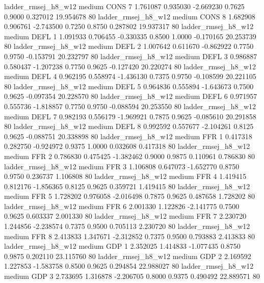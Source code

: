    ladder_rmsej_h8_w12     medium     CONS                 7  1.761087 0.935030 -2.669230 0.7625 0.9000  0.327012   19.954678 80
   ladder_rmsej_h8_w12     medium     CONS                 8  1.682908 0.906761 -2.743500 0.7250 0.8750  0.287802   19.937317 80
   ladder_rmsej_h8_w12     medium     DEFL                 1  1.091933 0.706455 -0.330335 0.8500 1.0000 -0.170165   20.253739 80
   ladder_rmsej_h8_w12     medium     DEFL                 2  1.007642 0.611670 -0.862922 0.7750 0.9750 -0.153791   20.232797 80
   ladder_rmsej_h8_w12     medium     DEFL                 3  0.986887 0.580437 -1.207238 0.7750 0.9625 -0.127420   20.220274 80
   ladder_rmsej_h8_w12     medium     DEFL                 4  0.962195 0.558974 -1.436130 0.7375 0.9750 -0.108599   20.221105 80
   ladder_rmsej_h8_w12     medium     DEFL                 5  0.964836 0.555894 -1.643673 0.7500 0.9625 -0.097354   20.228570 80
   ladder_rmsej_h8_w12     medium     DEFL                 6  0.971957 0.555736 -1.818857 0.7750 0.9750 -0.088594   20.253550 80
   ladder_rmsej_h8_w12     medium     DEFL                 7  0.982193 0.556179 -1.969921 0.7875 0.9625 -0.085610   20.291858 80
   ladder_rmsej_h8_w12     medium     DEFL                 8  0.992592 0.557677 -2.104261 0.8125 0.9625 -0.088751   20.338898 80
   ladder_rmsej_h8_w12     medium      FFR                 1  0.417318 0.282750 -0.924972 0.9375 1.0000  0.032608    0.417318 80
   ladder_rmsej_h8_w12     medium      FFR                 2  0.786830 0.475425 -1.382462 0.9000 0.9875  0.110961    0.786830 80
   ladder_rmsej_h8_w12     medium      FFR                 3  1.106808 0.647073 -1.652770 0.8750 0.9750  0.236737    1.106808 80
   ladder_rmsej_h8_w12     medium      FFR                 4  1.419415 0.812176 -1.856365 0.8125 0.9625  0.359721    1.419415 80
   ladder_rmsej_h8_w12     medium      FFR                 5  1.728202 0.976058 -2.016498 0.7875 0.9625  0.487658    1.728202 80
   ladder_rmsej_h8_w12     medium      FFR                 6  2.001330 1.122826 -2.141775 0.7500 0.9625  0.603337    2.001330 80
   ladder_rmsej_h8_w12     medium      FFR                 7  2.230720 1.244856 -2.238574 0.7375 0.9500  0.705113    2.230720 80
   ladder_rmsej_h8_w12     medium      FFR                 8  2.413833 1.347671 -2.312852 0.7375 0.9500  0.793883    2.413833 80
   ladder_rmsej_h8_w12     medium      GDP                 1  2.352025 1.414833 -1.077435 0.8750 0.9875  0.202110   23.115760 80
   ladder_rmsej_h8_w12     medium      GDP                 2  2.169592 1.227853 -1.583758 0.8500 0.9625  0.294854   22.988027 80
   ladder_rmsej_h8_w12     medium      GDP                 3  2.733695 1.316878 -2.206705 0.8000 0.9375  0.490492   22.889571 80
